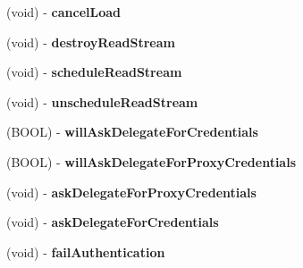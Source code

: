 \begin{DoxyCompactItemize}
\item 
\hypertarget{interface_a_s_i_h_t_t_p_request_07_08_ad64a88ff354a1e9acd0e50f6bd6383af}{
(void) -\/ {\bfseries cancel\-Load}}
\label{interface_a_s_i_h_t_t_p_request_07_08_ad64a88ff354a1e9acd0e50f6bd6383af}

\item 
\hypertarget{interface_a_s_i_h_t_t_p_request_07_08_ab3dbbd41ced7e54f058267aaa2e80150}{
(void) -\/ {\bfseries destroy\-Read\-Stream}}
\label{interface_a_s_i_h_t_t_p_request_07_08_ab3dbbd41ced7e54f058267aaa2e80150}

\item 
\hypertarget{interface_a_s_i_h_t_t_p_request_07_08_a9298c802e2cd503d0f3ae6f508f59e52}{
(void) -\/ {\bfseries schedule\-Read\-Stream}}
\label{interface_a_s_i_h_t_t_p_request_07_08_a9298c802e2cd503d0f3ae6f508f59e52}

\item 
\hypertarget{interface_a_s_i_h_t_t_p_request_07_08_a036ae593e23c948377acca2d405ab265}{
(void) -\/ {\bfseries unschedule\-Read\-Stream}}
\label{interface_a_s_i_h_t_t_p_request_07_08_a036ae593e23c948377acca2d405ab265}

\item 
\hypertarget{interface_a_s_i_h_t_t_p_request_07_08_a2fb19d10e5d6449c7845042add6dc2a1}{
(\-B\-O\-O\-L) -\/ {\bfseries will\-Ask\-Delegate\-For\-Credentials}}
\label{interface_a_s_i_h_t_t_p_request_07_08_a2fb19d10e5d6449c7845042add6dc2a1}

\item 
\hypertarget{interface_a_s_i_h_t_t_p_request_07_08_a52ecd8ea9d13c585c86a7f9031f1d2e8}{
(\-B\-O\-O\-L) -\/ {\bfseries will\-Ask\-Delegate\-For\-Proxy\-Credentials}}
\label{interface_a_s_i_h_t_t_p_request_07_08_a52ecd8ea9d13c585c86a7f9031f1d2e8}

\item 
\hypertarget{interface_a_s_i_h_t_t_p_request_07_08_a545869781fbd1e24ed126da754536006}{
(void) -\/ {\bfseries ask\-Delegate\-For\-Proxy\-Credentials}}
\label{interface_a_s_i_h_t_t_p_request_07_08_a545869781fbd1e24ed126da754536006}

\item 
\hypertarget{interface_a_s_i_h_t_t_p_request_07_08_a44501e22716b6373457e7f235775662c}{
(void) -\/ {\bfseries ask\-Delegate\-For\-Credentials}}
\label{interface_a_s_i_h_t_t_p_request_07_08_a44501e22716b6373457e7f235775662c}

\item 
\hypertarget{interface_a_s_i_h_t_t_p_request_07_08_aa65e69f36b090b963669094ce4e3ba31}{
(void) -\/ {\bfseries fail\-Authentication}}
\label{interface_a_s_i_h_t_t_p_request_07_08_aa65e69f36b090b963669094ce4e3ba31}


\end{DoxyCompactItemize}
